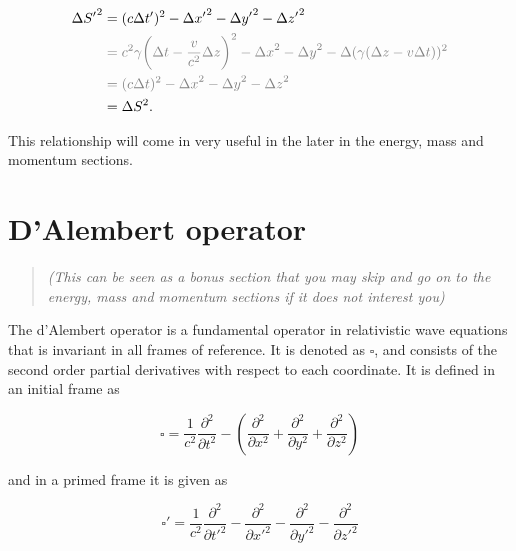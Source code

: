 \begin{equation}
	\begin{aligned}
		\Delta S{'}^2 & = (c{\Delta t{'}})^2-\Delta x{'}^2-{\Delta y{'}}^2-{\Delta z{'}}^2                                                                                          \\
		              & \color{gray} = {c}^2{\gamma} \bigg( \Delta t-\frac{v}{{c}^2} {\Delta z} \bigg)^2-{\Delta x}^2-{\Delta y}^2-\Delta ({\gamma} ( {\Delta z}- {v} \Delta t) )^2 \\
		              & \color{gray} = (c\Delta t)^2-{\Delta x}^2-{\Delta y}^2-{\Delta z}^2                                                                                         \\
		              & = \Delta S^2.
	\end{aligned}
\end{equation}

This relationship will come in very useful in the later in the energy, mass and momentum sections.

\section{D'Alembert operator}\label{sect: D'Alembert operator}

\begin{quote}\centering
\textit{\small (This can be seen as a bonus section that you may skip and go on to the energy, mass and momentum sections if it does not interest you)}
\end{quote}

The d'Alembert operator is a fundamental operator in relativistic wave equations that is invariant in all frames of reference.
It is denoted as $\square$, and consists of the second order partial derivatives with respect to each coordinate.
It is defined in an initial frame as

\begin{equation}
	\label{eq: d Alembert operator}
	\square = \frac{1}{c^2}\frac{\partial^2}{\partial t^2} - \left(\frac{\partial^2}{\partial x^2} + \frac{\partial^2}{\partial y^2} + \frac{\partial^2}{\partial z^2}\right)
\end{equation}

and in a primed frame it is given as

\begin{equation}
	\square' = \frac{1}{c^2} \frac{\partial^2}{\partial t'^2} - \frac{\partial^2}{\partial x'^2} - \frac{\partial^2}{\partial y'^2} - \frac{\partial^2}{\partial z'^2}
\end{equation}

